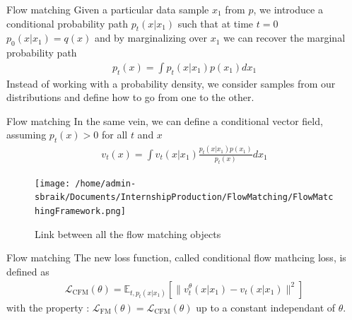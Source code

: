 \documentclass{beamer}
\begin{document}
\begin{frame}{Flow matching}
    Given a particular data sample \(x_1\) from \(p\), we introduce a conditional probability path \(p_t(x|x_1)\) such that at time \(t=0\) \(p_0(x|x_1)=q(x)\) and by marginalizing over \(x_1\) we can recover the marginal probability path 
    \begin{align}
        p_t(x)=\int p_t(x|x_1)p(x_1)dx_1
    \end{align}
    Instead of working with a probability density, we consider samples from our distributions and define how to go from one to the other.\\
\end{frame}
    
\begin{frame}{Flow matching}
    In the same vein, we can define a conditional vector field, assuming \(p_t(x)>0\) for all \(t\) and \(x\)
    \begin{align}
        v_t(x)=\int v_t(x|x_1)\frac{p_t(x|x_1)p(x_1)}{p_t(x)}dx_1
    \end{align}
\end{frame}

\begin{frame}
\begin{figure}
    \centering
    \texttt{[image: /home/admin-sbraik/Documents/InternshipProduction/FlowMatching/FlowMatchingFramework.png]}
    \caption{Link between all the flow matching objects}
    \label{fig:flow_matching_full}
\end{figure}
\end{frame}

\begin{frame}{Flow matching}
    The new loss function, called conditional flow mathcing loss, is defined as
    \begin{align}
        \mathcal{L}_\text{CFM}(\theta)=\mathbb{E}_{t,p_t(x|x_1)}\left[ \| v_t^\theta(x|x_1)-v_t(x|x_1)\|^2 \right]
    \end{align}
    with the property : \( \mathcal{L}_\text{FM}(\theta)=\mathcal{L}_\text{CFM}(\theta) \) up to a constant independant of \(\theta\).
\end{frame}
\end{document}

